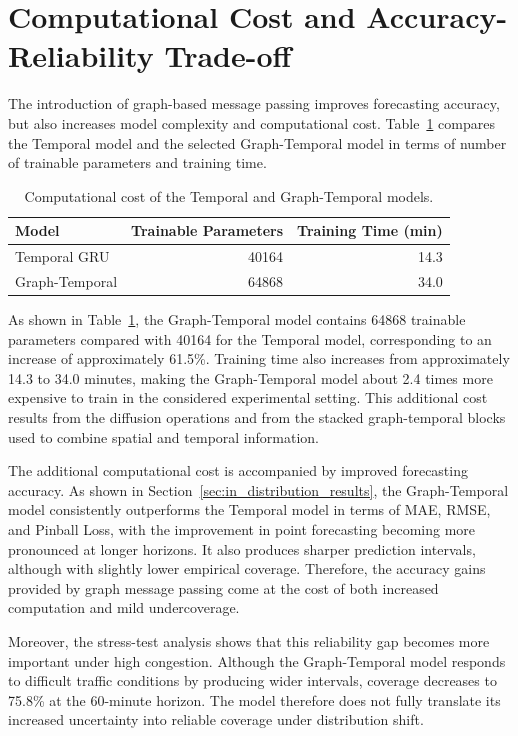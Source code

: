 \section{Computational Cost and Accuracy-Reliability Trade-off}
\label{sec:cost_tradeoff}

The introduction of graph-based message passing improves forecasting accuracy,
but also increases model complexity and computational cost.
Table~\ref{tab:computational_cost} compares the Temporal model and the selected
Graph-Temporal model in terms of number of trainable parameters and training
time.

\begin{table}[t]
    \centering
    \caption{Computational cost of the Temporal and Graph-Temporal models.}
    \label{tab:computational_cost}
    \begin{tabular}{lrr}
        \toprule
        Model & Trainable Parameters & Training Time (min) \\
        \midrule
        Temporal GRU   & 40164 & 14.3 \\
        Graph-Temporal & 64868 & 34.0 \\
        \bottomrule
    \end{tabular}
\end{table}

As shown in Table~\ref{tab:computational_cost}, the Graph-Temporal model
contains 64868 trainable parameters compared with 40164 for the Temporal
model, corresponding to an increase of approximately 61.5\%. Training time also
increases from approximately 14.3 to 34.0 minutes, making the Graph-Temporal
model about 2.4 times more expensive to train in the considered experimental
setting. This additional cost results from the diffusion operations and from
the stacked graph-temporal blocks used to combine spatial and temporal
information.

The additional computational cost is accompanied by improved forecasting
accuracy. As shown in Section~\ref{sec:in_distribution_results}, the
Graph-Temporal model consistently outperforms the Temporal model in terms of
MAE, RMSE, and Pinball Loss, with the improvement in point forecasting
becoming more pronounced at longer horizons. It also produces sharper
prediction intervals, although with slightly lower empirical coverage.
Therefore, the accuracy gains provided by graph message passing come at the
cost of both increased computation and mild undercoverage.

Moreover, the stress-test analysis shows that this reliability gap becomes
more important under high congestion. Although the Graph-Temporal model
responds to difficult traffic conditions by producing wider intervals,
coverage decreases to 75.8\% at the 60-minute horizon. The model therefore
does not fully translate its increased uncertainty into reliable coverage
under distribution shift.

